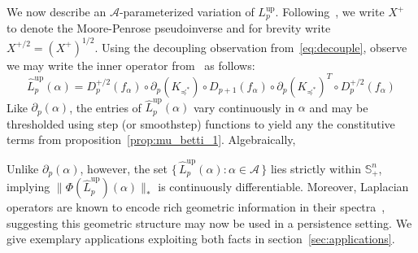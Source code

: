 \documentclass[10pt]{article}
\numberwithin{equation}{section}
\newcommand{\+}{%
	\raisebox{0.18ex}{\scaleobj{0.55}{+}}
}
\theoremstyle{definition}
\theoremstyle{definition}
\newcommand\numberthis{\addtocounter{equation}{1}\tag{\theequation}}
\begin{document}
We now describe an $\mathcal{A}$-parameterized variation of $L_p^{\mathrm{up}}$. Following~\cite{}, we write $X^+$ to denote the Moore-Penrose pseudoinverse and for brevity write $X^{+/2} = (X^{+})^{1/2}$. Using the decoupling observation from~\eqref{eq:decouple}, observe we may write the inner operator from~\cite{} as follows:
$$ \hat{L}_p^{\text{up}}(\alpha) = D_p^{+/2}(f_\alpha) \circ \partial_p(K_{\preceq^\ast}) \circ D_{p+1}(f_\alpha) \circ \partial_p(K_{\preceq^\ast})^T \circ D_p^{+/2}(f_\alpha) $$ 
Like $\partial_p(\alpha)$, the entries of $\hat{L}_p^{\text{up}}(\alpha)$ vary continuously in $\alpha$ and may be thresholded using step (or smoothstep) functions to yield any the constitutive terms from proposition~\ref{prop:mu_betti_1}. 
Algebraically, 

Unlike $\partial_p(\alpha)$, however, the set $\{ \, \hat{L}_p^{\mathrm{up}}(\alpha) : \alpha \in \mathcal{A} \, \}$ lies strictly within $\mathbb{S}^n_+$, implying $\lVert \Phi(\hat{L}_p^{\mathrm{up}})(\alpha) \rVert_\ast$ is continuously differentiable. Moreover, Laplacian operators are known to encode rich geometric information in their spectra~\cite{horak2013spectra}, suggesting this geometric structure may now be used in a persistence setting. We give exemplary applications exploiting both facts in section~\ref{sec:applications}. 
 


\end{document}
